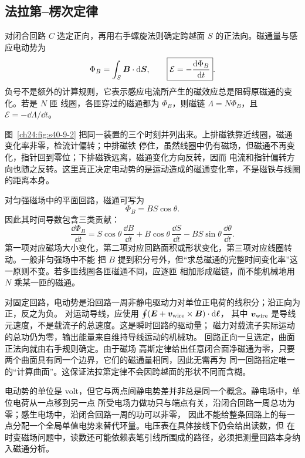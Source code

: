 {\faradayHistoryContext


\subsection{法拉第--楞次定律}


对闭合回路 $C$ 选定正向，再用右手螺旋法则确定跨越面 $S$ 的正法向。磁通量与感应电动势为
\begin{equation}
  \Phi_B=\int_S\bm{B}\cdot\mathop{}\!\mathrm d\bm{S},
  \qquad
  \boxed{\mathcal E=-\frac{\mathop{}\!\mathrm d\Phi_B}{\mathop{}\!\mathrm d t}}.
\end{equation}
负号不是额外的计算规则，它表示感应电流所产生的磁效应总是阻碍原磁通的变化。若是 $N$ 匝
线圈，各匝穿过的磁通都为 $\Phi_B$，则磁链 $\Lambda=N\Phi_B$，且 $\mathcal E=-\dd\Lambda/\dd t$。

图~\ref{ch24:fig:s40-9-2} 把同一装置的三个时刻并列出来。上排磁铁靠近线圈，磁通变化率非零，检流计偏转；中排磁铁
停住，虽然线圈中仍有磁场，但磁通不再变化，指针回到零位；下排磁铁远离，磁通变化方向反转，因而
电流和指针偏转方向也随之反转。这里真正决定电动势的是运动造成的磁通变化率，不是磁铁与线圈的距离本身。

\movingMagnetExperimentFigure

对匀强磁场中的平面回路，磁通可写为
\begin{equation}
  \Phi_B=BS\cos\theta.
\end{equation}
因此其时间导数包含三类贡献：
\begin{equation}
 \frac{\dd\Phi_B}{\dd t}
 =S\cos\theta\,\frac{\dd B}{\dd t}
 +B\cos\theta\,\frac{\dd S}{\dd t}
 -BS\sin\theta\,\frac{\dd\theta}{\dd t}.
\end{equation}
第一项对应磁场大小变化，第二项对应回路面积或形状变化，第三项对应线圈转动。一般非匀强场中不能
把 $B$ 提到积分号外，但“求总磁通的完整时间变化率”这一原则不变。若多匝线圈各匝磁通不同，应逐匝
相加形成磁链，而不能机械地用 $N$ 乘某一匝的磁通。

对固定回路，电动势是沿回路一周非静电驱动力对单位正电荷的线积分；沿正向为正，反之为负。
对运动导线，应使用 $\oint(\bm{E}+\bm{v}_{\rm wire}\times\bm{B})\cdot\mathop{}\!\mathrm d\bm{\ell}$，
其中 $\bm{v}_{\rm wire}$ 是导线元速度，不是载流子的总速度。这是瞬时回路的驱动量；
磁力对载流子实际运动的总功仍为零，输出能量来自维持导线运动的机械功。
回路正向一旦选定，曲面正法向就由右手规则确定。由于磁场
高斯定律给出任意闭合面净磁通为零，只要两个曲面具有同一个边界，它们的磁通量相同，因此无需再为
同一回路指定唯一的“计算曲面”。这保证法拉第定律不会因跨越面的形状不同而含糊。

电动势的单位是 volt，但它与两点间静电势差并非总是同一个概念。静电场中，单位电荷从一点移到另一点
所受电场力做功只与端点有关，沿闭合回路一周总功为零；感生电场中，沿闭合回路一周的功可以非零，
因此不能给整条回路上的每一点分配一个全局单值电势来替代环量。电压表在具体接线下仍会给出读数，但
在时变磁场问题中，读数还可能依赖表笔引线所围成的路径，必须把测量回路本身纳入磁通分析。

}
